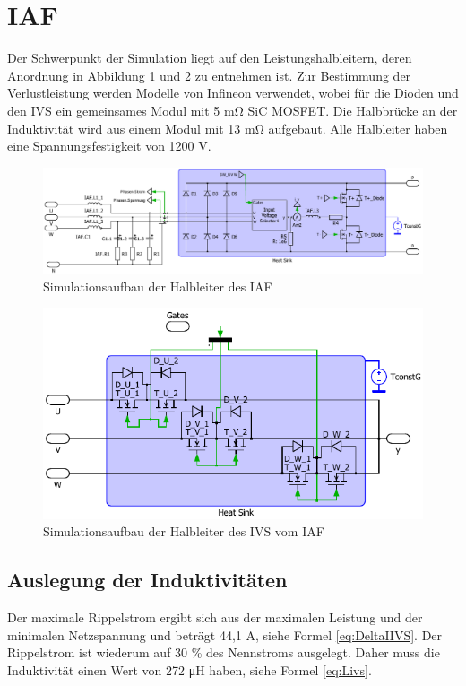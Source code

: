 \section{IAF}
	Der Schwerpunkt der Simulation liegt auf den Leistungshalbleitern, deren Anordnung in Abbildung \ref{fig:iafplecsmain} und \ref{fig:iafplecsivs} zu entnehmen ist. Zur Bestimmung der Verlustleistung werden Modelle von Infineon verwendet, wobei für die Dioden und den \gls{IVS} ein gemeinsames Modul mit 5 \si{\milli \ohm} \gls{SiC} \gls{MOSFET}. Die Halbbrücke an der Induktivität wird aus einem Modul mit 13 \si{\milli \ohm} aufgebaut. Alle Halbleiter haben eine Spannungsfestigkeit von 1200 V.
	\begin{figure}
		\centering
		\includegraphics[width=1\linewidth]{content/Grafiken/IAF_Plecs_main}
		\caption{Simulationsaufbau der Halbleiter des IAF}
		\label{fig:iafplecsmain}
	\end{figure}
	\begin{figure}
		\centering
		\includegraphics[width=0.9\linewidth]{content/Grafiken/IAF_Plecs_IVS}
		\caption{Simulationsaufbau der Halbleiter des IVS vom IAF}
		\label{fig:iafplecsivs}
	\end{figure}
	

	\subsection{Auslegung der Induktivitäten}
	Der maximale Rippelstrom ergibt sich aus der maximalen Leistung und der minimalen Netzspannung und beträgt 44,1 \si{\A}, siehe Formel \ref{eq:DeltaIIVS}. Der Rippelstrom ist wiederum auf 30 \% des Nennstroms ausgelegt. Daher muss die Induktivität einen Wert von 272 \si{\micro \henry} haben, siehe Formel \ref{eq:Livs}. 
		
